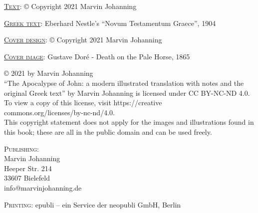 \thispagestyle{empty}
\noindent\textsc{\underline{Text}}: © Copyright 2021 Marvin Johanning

\noindent\textsc{\underline{Greek text}}: Eberhard Nestle's ``Novum Testamentum Graece'', 1904

\noindent\textsc{\underline{Cover design}}: © Copyright 2021 Marvin Johanning

\noindent\textsc{\underline{Cover image}}: Gustave Doré - Death on the Pale Horse, 1865

\bigskip

\noindent© 2021 by Marvin Johanning \ccbyncnd\\``The Apocalypse of John: a modern illustrated translation with notes and the original Greek text'' by Marvin Johanning is licensed under CC BY-NC-ND 4.0. To view a copy of this license, visit https://creative\\commons.org/licenses/by-nc-nd/4.0.\\This copyright statement does not apply for the images and illustrations found in this book; these are all in the public domain and can be used freely.

\vspace{10mm}\noindent\textsc{Publishing}: \\
Marvin Johanning\\
Heeper Str.  214\\
33607 Bielefeld\\
info@marvinjohanning.de

\vspace{5mm}\noindent\textsc{Printing}: epubli – ein Service der neopubli GmbH, Berlin
\newpage
